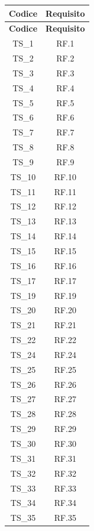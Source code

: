 \documentclass[12pt, a4paper]{article}
\begin{document}
\renewcommand{\arraystretch}{1.3}
\begin{xltabular}{\textwidth}{|c|c|}
    \hline
    \textbf{Codice} & \textbf{Requisito} \\ \hline
    \endfirsthead

    \hline
    \textbf{Codice} & \textbf{Requisito} \\ \hline
    \endhead

    TS\_1 & RF.1 \\\hline
    TS\_2 & RF.2 \\\hline
    TS\_3 & RF.3 \\\hline
    TS\_4 & RF.4 \\\hline
    TS\_5 & RF.5 \\\hline
    TS\_6 & RF.6 \\\hline
    TS\_7 & RF.7 \\\hline
    TS\_8 & RF.8 \\\hline
    TS\_9 & RF.9 \\\hline
    TS\_10 & RF.10 \\\hline
    TS\_11 & RF.11 \\\hline
    TS\_12 & RF.12 \\\hline
    TS\_13 & RF.13 \\\hline
    TS\_14 & RF.14 \\\hline
    TS\_15 & RF.15 \\\hline
    TS\_16 & RF.16 \\\hline
    TS\_17 & RF.17 \\\hline
    TS\_19 & RF.19 \\\hline
    TS\_20 & RF.20 \\\hline
    TS\_21 & RF.21 \\\hline
    TS\_22 & RF.22 \\\hline
    TS\_24 & RF.24 \\\hline
    TS\_25 & RF.25 \\\hline
    TS\_26 & RF.26 \\\hline
    TS\_27 & RF.27 \\\hline
    TS\_28 & RF.28 \\\hline
    TS\_29 & RF.29 \\\hline
    TS\_30 & RF.30 \\\hline
    TS\_31 & RF.31 \\\hline
    TS\_32 & RF.32 \\\hline
    TS\_33 & RF.33 \\\hline
    TS\_34 & RF.34 \\\hline
    TS\_35 & RF.35 \\\hline

\end{xltabular}
\end{document}
